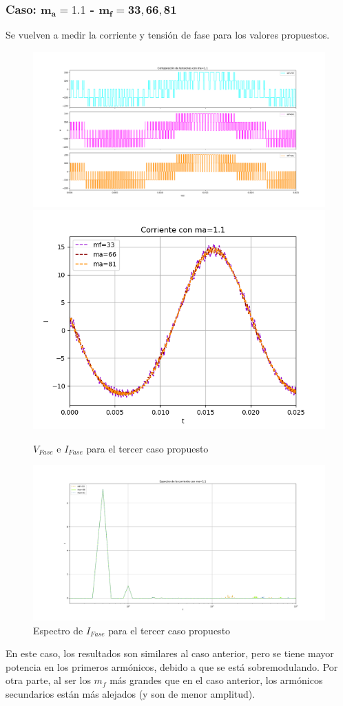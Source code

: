 \documentclass[e4_tp3_main.tex]{subfiles}
\begin{document}
\subsubsection{Caso: $\mathbf{m_a = 1.1}$ - $\mathbf{m_f = 33,66,81}$}
Se vuelven a medir la corriente y tensión de fase para los valores propuestos.
\begin{figure}[H]
\centering
\includegraphics[width=0.49\linewidth]{Imagenes/Ej2d_V.png}
\includegraphics[width=0.49\linewidth]{Imagenes/Ej2d_I.png}
\caption{$V_{Fase}$ e $I_{Fase}$ para el tercer caso propuesto}
\end{figure}
\begin{figure}[H]
\centering
\includegraphics[width=0.9\linewidth]{Imagenes/Ej2dfft.png}
\caption{Espectro de $I_{Fase}$ para el tercer caso propuesto}
\end{figure}

En este caso, los resultados son similares al caso anterior, pero se tiene mayor potencia en los primeros armónicos, debido a que se está sobremodulando. Por otra parte, al ser los $m_f$ más grandes que en el caso anterior, los armónicos secundarios están más alejados (y son de menor amplitud). 
\end{document}
